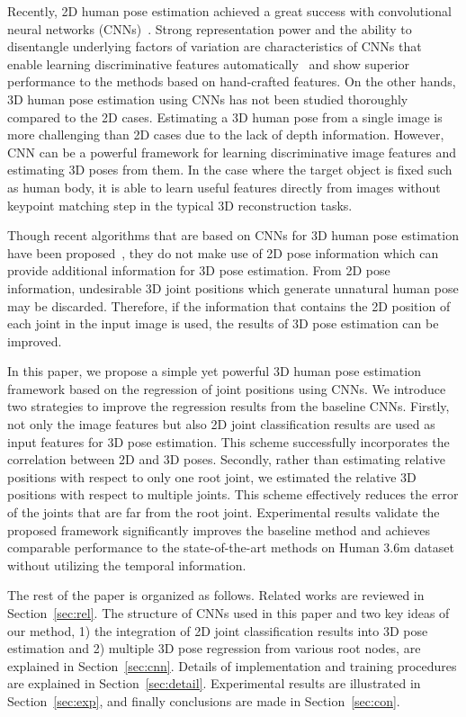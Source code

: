 \documentclass[runningheads]{llncs}
\begin{document}
Recently, 2D human pose estimation achieved a great success with convolutional neural networks (CNNs)~\cite{toshev2014deeppose,carreira2015human,wei2016convolutional}. Strong representation power and the ability to disentangle underlying factors of variation are characteristics of CNNs that enable learning discriminative features automatically~\cite{bengio2009learning} and show superior performance to the methods based on hand-crafted features. On the other hands, 3D human pose estimation using CNNs has not been studied thoroughly compared to the 2D cases. Estimating a 3D human pose from a single image is more challenging than 2D cases due to the lack of depth information. However, CNN can be a powerful framework for learning discriminative image features and estimating 3D poses from them. In the case where the target object is fixed such as human body, it is able to learn useful features directly from images without keypoint matching step in the typical 3D reconstruction tasks.

Though recent algorithms that are based on CNNs for 3D human pose estimation have been proposed~\cite{li20143d,li2015maximum,tekin2016structured}, they do not make use of 2D pose information which can provide additional information for 3D pose estimation. From 2D pose information, undesirable 3D joint positions which generate unnatural human pose may be discarded. Therefore, if the information that contains the 2D position of each joint in the input image is used, the results of 3D pose estimation can be improved.

In this paper, we propose a simple yet powerful 3D human pose estimation framework based on the regression of joint positions using CNNs. We introduce two strategies to improve the regression results from the baseline CNNs. Firstly, not only the image features but also 2D joint classification results are used as input features for 3D pose estimation. This scheme successfully incorporates the correlation between 2D and 3D poses. Secondly, rather than estimating relative positions with respect to only one root joint, we estimated the relative 3D positions with respect to multiple joints. This scheme effectively reduces the error of the joints that are far from the root joint. Experimental results validate the proposed framework significantly improves the baseline method and achieves comparable performance to the state-of-the-art methods on Human 3.6m dataset~\cite{h36m_pami} without utilizing the temporal information.

The rest of the paper is organized as follows. Related works are reviewed in Section~\ref{sec:rel}. The structure of CNNs used in this paper and two key ideas of our method, 1) the integration of 2D joint classification results into 3D pose estimation and 2) multiple 3D pose regression from various root nodes, are explained in Section~\ref{sec:cnn}. Details of implementation and training procedures are explained in Section~\ref{sec:detail}. Experimental results are illustrated in Section~\ref{sec:exp}, and finally conclusions are made in Section~\ref{sec:con}.
\end{document}
